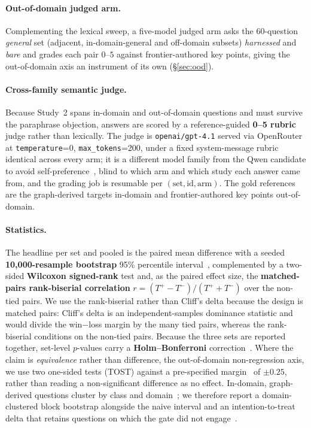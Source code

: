 \documentclass[10pt,twocolumn]{article}
\begin{document}
\paragraph{Out-of-domain judged arm.} Complementing the lexical sweep, a five-model judged arm asks
the 60-question \emph{general} set (adjacent, in-domain-general and off-domain subsets)
\emph{harnessed} and \emph{bare} and grades each pair $0$--$5$ against frontier-authored key points,
giving the out-of-domain axis an instrument of its own (\S\ref{sec:ood}).

\paragraph{Cross-family semantic judge.} Because Study~2 spans in-domain and out-of-domain questions
and must survive the paraphrase objection, answers are scored by a reference-guided
\textbf{0--5 rubric} judge rather than lexically. The judge is \texttt{openai/gpt-4.1} served via
OpenRouter at \texttt{temperature}=0, \texttt{max\_tokens}=200, under a fixed system-message rubric
identical across every arm; it is a different model family from the Qwen candidate to avoid
self-preference~\cite{zheng2023judging,panickssery2024selfpreference}, blind to which arm and which
study each answer came from, and the grading job is resumable per $(\text{set},\text{id},\text{arm})$.
The gold references are the graph-derived targets in-domain and frontier-authored key points
out-of-domain.

\paragraph{Statistics.} The headline per set and pooled is the paired mean difference with a seeded
\textbf{10{,}000-resample bootstrap} 95\% percentile interval~\cite{efron1979bootstrap,koehn2004significance},
complemented by a two-sided \textbf{Wilcoxon signed-rank} test and, as the paired effect size, the
\textbf{matched-pairs rank-biserial correlation} $r=(T^{+}-T^{-})/(T^{+}+T^{-})$ over the non-tied
pairs. We use the rank-biserial rather than Cliff's delta because the design is matched pairs: Cliff's
delta is an independent-samples dominance statistic and would divide the win$-$loss margin by the many
tied pairs, whereas the rank-biserial conditions on the non-tied pairs. Because the three sets are
reported together, set-level $p$-values
carry a \textbf{Holm--Bonferroni} correction~\cite{dror2018hitchhiker}. Where the claim is
\emph{equivalence} rather than difference, the out-of-domain non-regression axis, we use two
one-sided tests (TOST) against a pre-specified margin~\cite{lakens2017equivalence} of
$\pm0.25$, rather than reading a non-significant difference as no effect. In-domain,
graph-derived questions cluster by class and domain~\cite{dror2018hitchhiker}; we therefore report
a domain-clustered block bootstrap alongside the naive interval and an intention-to-treat delta that
retains questions on which the gate did not engage~\cite{hollis1999itt}.
\end{document}
